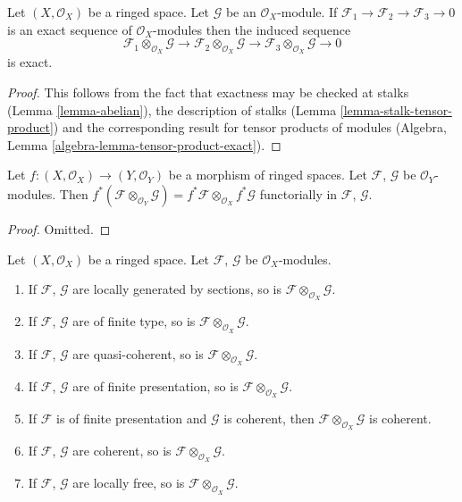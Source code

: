 \begin{lemma}
\label{lemma-tensor-product-exact}
Let $(X, \mathcal{O}_X)$ be a ringed space.
Let $\mathcal{G}$ be an $\mathcal{O}_X$-module.
If
$\mathcal{F}_1
\to \mathcal{F}_2
\to \mathcal{F}_3
\to 0$
is an exact sequence of $\mathcal{O}_X$-modules then
the induced sequence
$$
\mathcal{F}_1 \otimes_{\mathcal{O}_X} \mathcal{G} \to
\mathcal{F}_2 \otimes_{\mathcal{O}_X} \mathcal{G} \to
\mathcal{F}_3 \otimes_{\mathcal{O}_X} \mathcal{G} \to
0
$$
is exact.
\end{lemma}

\begin{proof}
This follows from the fact that exactness may be checked at stalks
(Lemma \ref{lemma-abelian}), the description of stalks
(Lemma \ref{lemma-stalk-tensor-product}) and the corresponding
result for tensor products of modules
(Algebra, Lemma \ref{algebra-lemma-tensor-product-exact}).
\end{proof}

\begin{lemma}
\label{lemma-tensor-product-pullback}
Let $f : (X, \mathcal{O}_X) \to (Y, \mathcal{O}_Y)$ be
a morphism of ringed spaces. Let $\mathcal{F}$, $\mathcal{G}$
be $\mathcal{O}_Y$-modules. Then
$f^*(\mathcal{F} \otimes_{\mathcal{O}_Y} \mathcal{G})
= f^*\mathcal{F} \otimes_{\mathcal{O}_X} f^*\mathcal{G}$
functorially in $\mathcal{F}$, $\mathcal{G}$.
\end{lemma}

\begin{proof}
Omitted.
\end{proof}

\begin{lemma}
\label{lemma-tensor-product-permanence}
Let $(X, \mathcal{O}_X)$ be a ringed space.
Let $\mathcal{F}$, $\mathcal{G}$ be $\mathcal{O}_X$-modules.
\begin{enumerate}
\item If $\mathcal{F}$, $\mathcal{G}$ are locally generated
by sections, so is $\mathcal{F}\otimes_{\mathcal{O}_X} \mathcal{G}$.
\item If $\mathcal{F}$, $\mathcal{G}$ are of finite type,
so is $\mathcal{F}\otimes_{\mathcal{O}_X} \mathcal{G}$.
\item If $\mathcal{F}$, $\mathcal{G}$ are quasi-coherent,
so is $\mathcal{F}\otimes_{\mathcal{O}_X} \mathcal{G}$.
\item If $\mathcal{F}$, $\mathcal{G}$ are of finite presentation,
so is $\mathcal{F}\otimes_{\mathcal{O}_X} \mathcal{G}$.
\item If $\mathcal{F}$ is of finite presentation and $\mathcal{G}$ is coherent,
then $\mathcal{F}\otimes_{\mathcal{O}_X} \mathcal{G}$ is coherent.
\item If $\mathcal{F}$, $\mathcal{G}$ are coherent,
so is $\mathcal{F}\otimes_{\mathcal{O}_X} \mathcal{G}$.
\item If $\mathcal{F}$, $\mathcal{G}$ are locally free,
so is $\mathcal{F}\otimes_{\mathcal{O}_X} \mathcal{G}$.
\end{enumerate}
\end{lemma}

